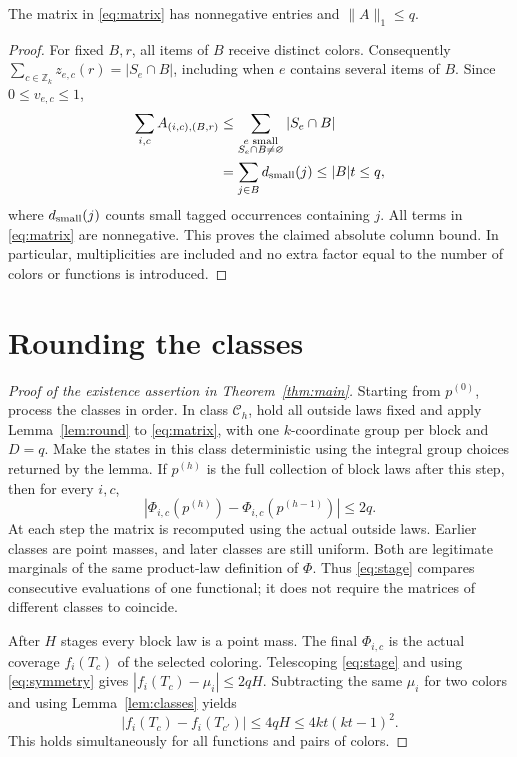 \documentclass[acmsmall,11pt,nonacm]{acmart}
\newcommand{\Zk}{\mathbb{Z}_k}
\newcommand{\calC}{\mathcal{C}}
\newcommand{\Phiic}{\Phi_{i,c}}
\begin{document}
\begin{lemma}
\label{lem:column}
The matrix in \eqref{eq:matrix} has nonnegative entries and
$\|A\|_1\le q$.
\end{lemma}
\begin{proof}
For fixed $B,r$, all items of $B$ receive distinct colors. Consequently
$\sum_{c\in\Zk}z_{e,c}(r)=|S_e\cap B|$, including when $e$ contains
several items of $B$. Since $0\le v_{e,c}\le1$,
\begin{align}
 \sum_{i,c} A_{(i,c),(B,r)}
 &\le\sum_{\substack{e\text{ small}\\S_e\cap B\ne\varnothing}}
                       |S_e\cap B| \notag\\
 &=\sum_{j\in B}d_{\rm small}(j)
 \le |B|t\le q,
 \label{eq:column}
\end{align}
where $d_{\rm small}(j)$ counts small tagged occurrences containing $j$.
All terms in \eqref{eq:matrix} are nonnegative. This proves the claimed
absolute column bound. In particular, multiplicities are included and no
extra factor equal to the number of colors or functions is introduced.
\end{proof}

\section{Rounding the classes}
\label{sec:finish}

\begin{proof}[Proof of the existence assertion in Theorem~\ref{thm:main}]
Starting from $p^{(0)}$, process the classes in order. In class
$\calC_h$, hold all outside laws fixed and apply Lemma~\ref{lem:round}
to \eqref{eq:matrix}, with one $k$-coordinate group per block and $D=q$.
Make the states in this class deterministic using the integral group
choices returned by the lemma. If $p^{(h)}$ is the full collection of
block laws after this step, then for every $i,c$,
\begin{equation}
 |\Phiic(p^{(h)})-\Phiic(p^{(h-1)})|\le2q.
 \label{eq:stage}
\end{equation}
At each step the matrix is recomputed using the actual outside laws.
Earlier classes are point masses, and later classes are still uniform.
Both are legitimate marginals of the same product-law definition of
$\Phi$. Thus \eqref{eq:stage} compares consecutive evaluations of one
functional; it does not require the matrices of different classes to
coincide.

After $H$ stages every block law is a point mass. The final $\Phiic$ is
the actual coverage $f_i(T_c)$ of the selected coloring. Telescoping
\eqref{eq:stage} and using \eqref{eq:symmetry} gives
$|f_i(T_c)-\mu_i|\le2qH$. Subtracting the same $\mu_i$ for two colors
and using Lemma~\ref{lem:classes} yields
\[
 |f_i(T_c)-f_i(T_{c'})|\le4qH\le4kt(kt-1)^2.
\]
This holds simultaneously for all functions and pairs of colors.
\end{proof}
\end{document}
